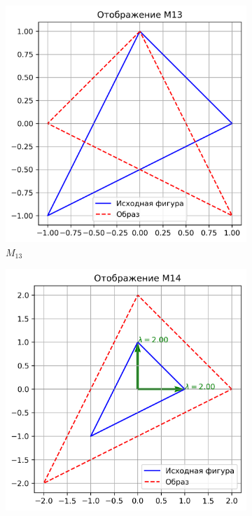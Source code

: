 \begin{figure}[H]
  \centering
  \begin{subfigure}[b]{0.3\textwidth}
    \includegraphics[width=\linewidth]{plots/M13.png}
    \caption{$M_{13}$}
  \end{subfigure}\hfill
  \begin{subfigure}[b]{0.3\textwidth}
    \includegraphics[width=\linewidth]{plots/M14.png}

\end{subfigure}
\end{figure}
